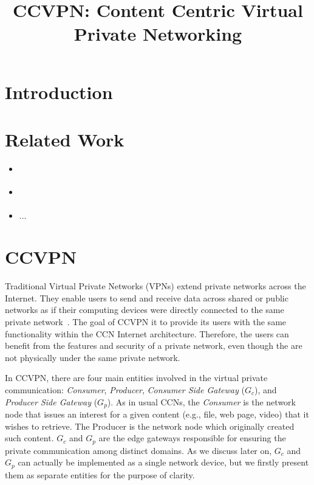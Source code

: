 \documentclass[conference,letterpaper,10pt]{IEEEtran}
\begin{document}
\title{CCVPN: Content Centric Virtual Private Networking}


\maketitle


\begin{abstract}


\end{abstract}

\begin{IEEEkeywords}
\end{IEEEkeywords}

\IEEEpeerreviewmaketitle

\section{Introduction}


\section{Related Work}\label{related}

\begin{itemize}
\item \cite{tsudik2016ac3n}
\item \cite{dibenedetto2011andana}
\item ...
\end{itemize}

\section{CCVPN}\label{metho}

Traditional Virtual Private Networks (VPNs) extend private networks across the Internet. They enable users to send and receive data across shared or public networks as if their computing devices were directly connected to the same private network~\cite{khanvilkar2004virtual}. The goal of CCVPN it to provide its users with the same functionality within the CCN Internet architecture. Therefore, the users can benefit from the features and security of a private network, even though the are not physically under the same private network.

In CCVPN, there are four main entities involved in the virtual private communication: \textit{Consumer}, \textit{Producer}, \textit{Consumer Side Gateway} ($G_c$), and \textit{Producer Side Gateway} ($G_p$). As in usual CCNs, the \textit{Consumer} is the network node that issues an interest for a given content (e.g., file, web page, video) that it wishes to retrieve. The Producer is the network node which originally created such content. $G_c$ and $G_p$ are the edge gateways responsible for ensuring the private communication among distinct domains. As we discuss later on, $G_c$ and $G_p$ can actually be implemented as a single network device, but we firstly present them as separate entities for the purpose of clarity.
\end{document}
